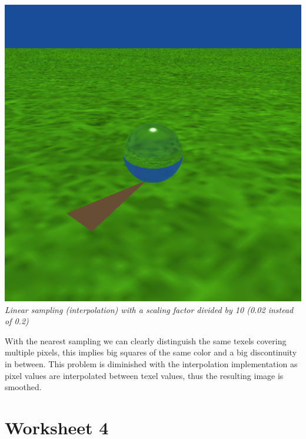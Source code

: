 \documentclass[a4,12pt]{article}
\begin{document}
\begin{center}
		\begin{minipage}[b]{0.40\linewidth}
			\begin{center}
				\includegraphics[width =\textwidth]{./Worksheet3/MagnifRenduInterpo.png}\\
				\textit{Linear sampling (interpolation) with a scaling factor divided by 10 (0.02 instead of 0.2)}
			\end{center}
		\end{minipage}
	\end{center}
	
	With the nearest sampling we can clearly distinguish the same texels covering multiple pixels, this implies big squares of the same color and a big discontinuity in between. This problem is diminished with the interpolation implementation as pixel values are interpolated between texel values, thus the resulting image is smoothed.
	
	\section{Worksheet 4}
\end{document}
